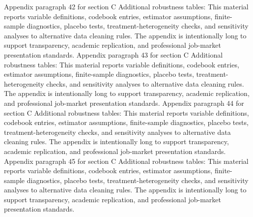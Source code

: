 \documentclass[preprint,12pt]{elsarticle}
\begin{document}
Appendix paragraph 42 for section C Additional robustness tables: This material reports variable definitions, codebook entries, estimator assumptions, finite-sample diagnostics, placebo tests, treatment-heterogeneity checks, and sensitivity analyses to alternative data cleaning rules. The appendix is intentionally long to support transparency, academic replication, and professional job-market presentation standards.
Appendix paragraph 43 for section C Additional robustness tables: This material reports variable definitions, codebook entries, estimator assumptions, finite-sample diagnostics, placebo tests, treatment-heterogeneity checks, and sensitivity analyses to alternative data cleaning rules. The appendix is intentionally long to support transparency, academic replication, and professional job-market presentation standards.
Appendix paragraph 44 for section C Additional robustness tables: This material reports variable definitions, codebook entries, estimator assumptions, finite-sample diagnostics, placebo tests, treatment-heterogeneity checks, and sensitivity analyses to alternative data cleaning rules. The appendix is intentionally long to support transparency, academic replication, and professional job-market presentation standards.
Appendix paragraph 45 for section C Additional robustness tables: This material reports variable definitions, codebook entries, estimator assumptions, finite-sample diagnostics, placebo tests, treatment-heterogeneity checks, and sensitivity analyses to alternative data cleaning rules. The appendix is intentionally long to support transparency, academic replication, and professional job-market presentation standards.
\end{document}

